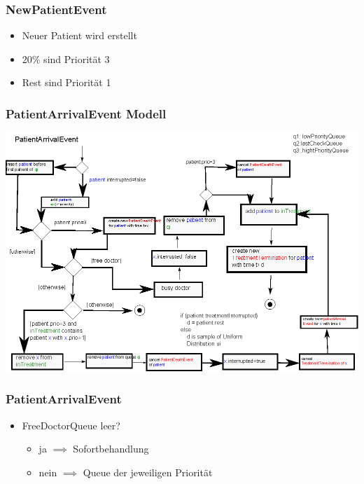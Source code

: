 \documentclass{beamer}
\begin{document}
\begin{frame}
	\frametitle{NewPatientEvent}
	\begin{itemize}
		\item Neuer Patient wird erstellt
		\item 20\% sind Priorit\"{a}t 3
		\item Rest sind Priorit\"{a}t 1
	\end{itemize}		
\end{frame}

\begin{frame}
	\frametitle{PatientArrivalEvent Modell}
	\begin{center}
		\includegraphics[scale=0.8]{img/PatientArrivalEvent.eps}
	\end{center}
\end{frame}

\begin{frame}
	\frametitle{PatientArrivalEvent}
	\begin{itemize}
		\item FreeDoctorQueue leer? 
		\begin{itemize}
			\item ja $\implies$ Sofortbehandlung
			\item nein $\implies$ Queue der jeweiligen Priorit\"{a}t
		\end{itemize}
	\end{itemize}
\end{frame}
\end{document}

